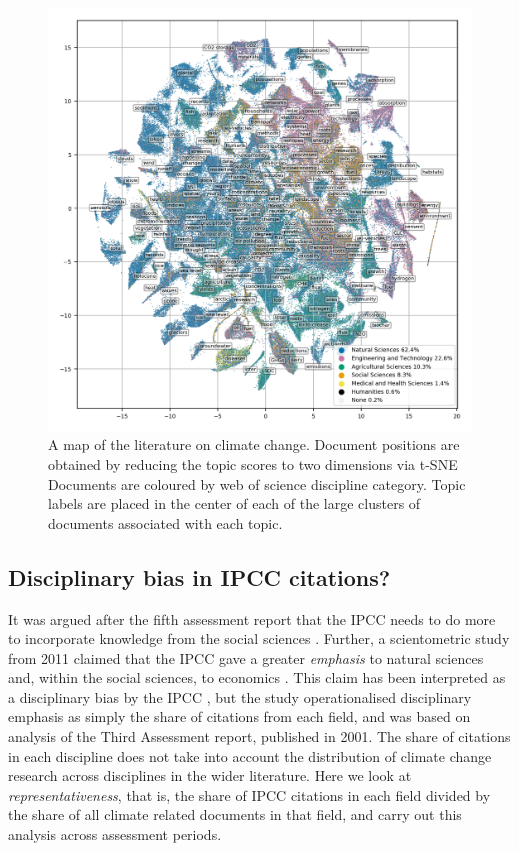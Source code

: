 \documentclass{article}
\begin{document}
\begin{linenumbers}
\begin{figure}[htp]
	\begin{center}
		\includegraphics[width=180mm]{tsne_results/plots/run_1861_s_0_p100_all_topic_words_oecds.png}
		\caption{A map of the literature on climate change. Document positions are obtained by reducing the topic scores to two dimensions via t-SNE Documents are coloured by web of science discipline category. Topic labels are placed in the center of each of the large clusters of documents associated with each topic. }
		\label{oecd_topic_map}
	\end{center}
\end{figure}

\subsection*{Disciplinary bias in IPCC citations?}

It was argued after the fifth assessment report that the IPCC needs to do more to incorporate knowledge from the social sciences \cite{Victor2015}. Further, a scientometric study from 2011 claimed that the IPCC gave a greater \textit{emphasis} to natural sciences and, within the social sciences, to economics \cite{Bjurström2011}. This claim has been interpreted as a disciplinary bias by the IPCC \cite{Hulme2010, Corbera2016}, but the study operationalised disciplinary emphasis as simply the share of citations from each field, and was based on analysis of the Third Assessment report, published in 2001. The share of citations in each discipline does not take into account the distribution of climate change research across disciplines in the wider literature. Here we look at \textit{representativeness}, that is, the share of IPCC citations in each field divided by the share of all climate related documents in that field, and carry out this analysis across assessment periods.


\end{linenumbers}
\end{document}
